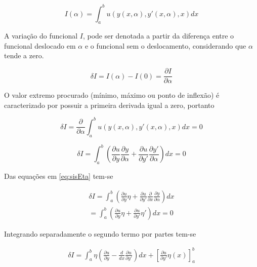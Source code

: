 \begin{equation}
\label{eq:funcionalVar}
I(\alpha) = \int_{a}^{b} u(y(x, \alpha), y'(x, \alpha), x) dx
\end{equation}

A variação do funcional $ I $, pode ser denotada a partir da diferença entre o funcional deslocado em $ \alpha $ e o funcional sem o deslocamento, considerando que $\alpha $ tende a zero.

\begin{equation}
\delta I = I(\alpha) - I(0) = \frac{\partial I}{\partial \alpha}
\end{equation}

O valor extremo procurado (mínimo, máximo ou ponto de inflexão) é caracterizado por possuir a primeira derivada igual a zero, portanto

\begin{equation}
\delta I = \frac{\partial}{\partial \alpha} \int_{a}^{b} u(y(x, \alpha), y'(x, \alpha), x) dx = 0
\end{equation}

\begin{equation}
\delta I = \int_{a}^{b} \left(\frac{\partial u}{\partial y} \frac{\partial y}{\partial \alpha} + \frac{\partial u}{\partial y'} \frac{\partial y'}{\partial \alpha}\right) dx = 0
\end{equation}

Das equações em \ref{eq:sisEta} tem-se 

\begin{equation}
\begin{split}
\delta I = \int_{a}^{b} \left(\frac{\partial u}{\partial y} \eta + \frac{\partial u}{\partial y'} \frac{\partial }{\partial x}
\frac{\partial y}{\partial \alpha}\right) dx \\
= \int_{a}^{b} \left(\frac{\partial u}{\partial y} \eta + \frac{\partial u}{\partial y'} \eta'
\right) dx = 0
\end{split}
\end{equation}

Integrando separadamente o segundo termo por partes tem-se

\begin{equation}
\begin{split}
\delta I = \int_{a}^{b} \eta \left(\frac{\partial u}{\partial y} - \frac{d}{dx} 
\frac{\partial u}{\partial y'}\right)  dx +
\left[\frac{\partial u}{\partial y'} \eta(x) \right]_a^b
\end{split}
\end{equation}

